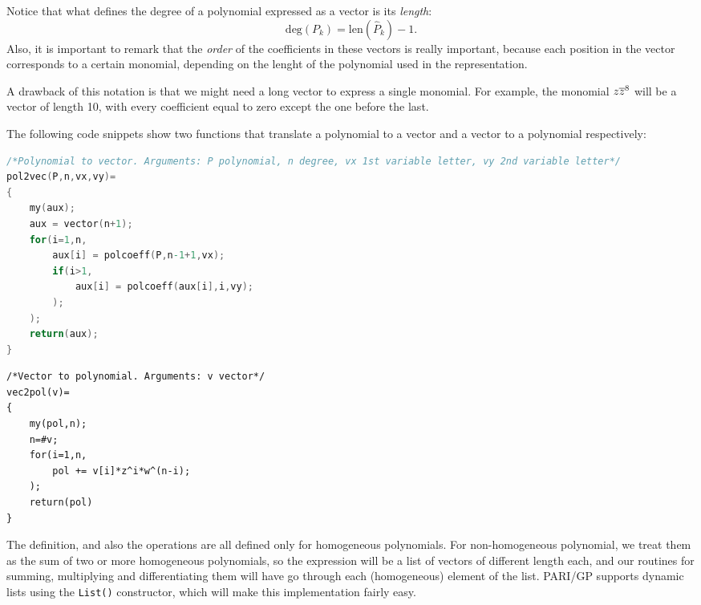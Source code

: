 \begin{observacio}
Notice that what defines the degree of a polynomial expressed as a vector is its \emph{length}:
\[\mathrm{deg}(P_k)=\mathrm{len}(\hat P_k)-1.\]
Also, it is important to remark that the \emph{order} of the coefficients in these vectors is really important, because each position in the vector corresponds to a certain monomial, depending on the lenght of the polynomial used in the representation.

A drawback of this notation is that we might need a long vector to express a single monomial. For example, the monomial $z\overline{z}^8$ will be a vector of length 10, with every coefficient equal to zero except the one before the last.
\end{observacio}


The following code snippets show two functions that translate a polynomial to a vector and a vector to a polynomial respectively:
\begin{center}
\begin{minipage}{0.8\textwidth}
\begin{lstlisting}[language=C,caption={PARI/GP function that takes in an homogeneous polynomial, its degree (although this could be obtained from the polynomial automatically), and the names of the variables, and returns a vector following Definition \ref{def.pol2vec}.}]
/*Polynomial to vector. Arguments: P polynomial, n degree, vx 1st variable letter, vy 2nd variable letter*/
pol2vec(P,n,vx,vy)=
{
	my(aux);
	aux = vector(n+1);
	for(i=1,n,
		aux[i] = polcoeff(P,n-1+1,vx);
		if(i>1,
			aux[i] = polcoeff(aux[i],i,vy);
		);
	);
	return(aux);
}
\end{lstlisting}
\end{minipage}
\end{center}


\begin{center}
\begin{minipage}{0.8\textwidth}
\begin{lstlisting}[caption={PARI/GP function that takes a vector and returns the corresponding polynomial with variables $z$ and $w=\z$.}]
/*Vector to polynomial. Arguments: v vector*/
vec2pol(v)=
{
    my(pol,n);
    n=#v;
    for(i=1,n,
        pol += v[i]*z^i*w^(n-i);
    );
    return(pol)
}
\end{lstlisting}
\end{minipage}
\end{center}

\begin{observacio}
The definition, and also the operations are all defined only for homogeneous polynomials. For non-homogeneous polynomial, we treat them as the sum of two or more homogeneous polynomials, so the expression will be a list of vectors of different length each, and our routines for summing, multiplying and differentiating them will have go through each (homogeneous) element of the list. PARI/GP supports dynamic lists using the \texttt{List()} constructor, which will make this implementation fairly easy.
\end{observacio}

